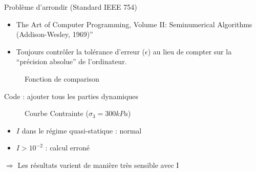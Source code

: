 \documentclass[10pt]{beamer}
\begin{document}
\begin{frame}{Problème d'arrondir (Standard IEEE 754)}
    \begin{itemize}
        \item The Art of Computer Programming, Volume II: Seminumerical Algorithms (Addison-Wesley, 1969)”
        \item Toujours contrôler la tolérance d’erreur ($\epsilon$) au lieu de compter sur la “précision absolue” de l’ordinateur.
    \end{itemize}
    \begin{figure}[h]
        \centering
        \caption{Fonction de comparison}
    \end{figure}
\end{frame}


\begin{frame}{Code : ajouter tous les parties dynamiques}
    \begin{figure}[h]
        \centering
        \scalebox{0.5}{}
        \caption{Courbe Contrainte ($\sigma_3 = 300kPa$)}
    \end{figure}
    \begin{itemize}
        \item $I$ dans le régime quasi-statique : normal
        \item $I > 10^{-2}$ : calcul erroné
    \end{itemize}
    $\Rightarrow$ Les résultats varient de manière très sensible avec I
\end{frame}
\end{document}
